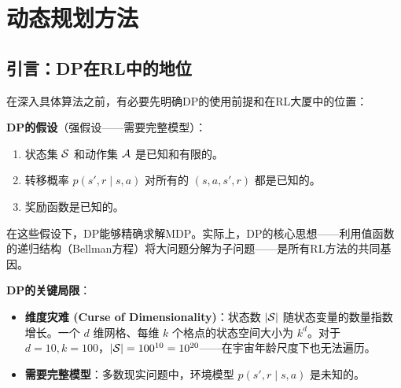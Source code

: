 \chapter{动态规划方法}\label{ch:dp}


\section{引言：DP在RL中的地位}

在深入具体算法之前，有必要先明确DP的使用前提和在RL大厦中的位置：

\textbf{DP的假设}（强假设——需要完整模型）：
\begin{enumerate}
    \item 状态集 $\mathcal{S}$ 和动作集 $\mathcal{A}$ 是已知和有限的。
    \item 转移概率 $p(s', r \mid s, a)$ 对所有的 $(s, a, s', r)$ 都是已知的。
    \item 奖励函数是已知的。
\end{enumerate}

在这些假设下，DP能够精确求解MDP。实际上，DP的核心思想——利用值函数的递归结构（Bellman方程）将大问题分解为子问题——是所有RL方法的共同基因。

\textbf{DP的关键局限}：
\begin{itemize}
    \item \textbf{维度灾难 (Curse of Dimensionality)}：状态数 $|\mathcal{S}|$ 随状态变量的数量指数增长。一个 $d$ 维网格、每维 $k$ 个格点的状态空间大小为 $k^d$。对于 $d=10, k=100$，$|\mathcal{S}| = 100^{10} = 10^{20}$——在宇宙年龄尺度下也无法遍历。
    \item \textbf{需要完整模型}：多数现实问题中，环境模型 $p(s', r \mid s, a)$ 是未知的。
\end{itemize}

